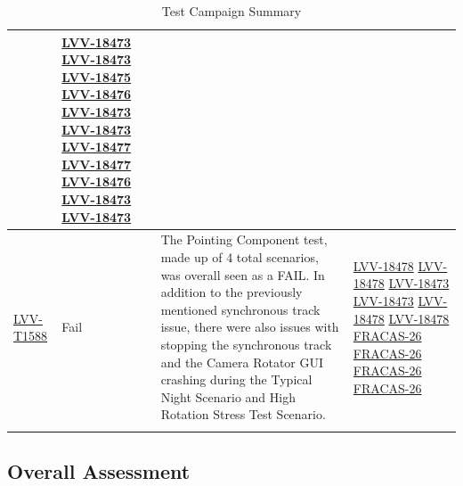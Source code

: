 \documentclass[SE,lsstdraft,STR,toc]{lsstdoc}
\begin{document}
\begin{longtable}{p{2cm}p{2.5cm}p{9cm}p{2.5cm}}
\begin{minipage}[]{9cm}
    \medskip
    \end{minipage}
    &
          \href{https://jira.lsstcorp.org/browse/LVV-18473}{LVV-18473}
          \href{https://jira.lsstcorp.org/browse/LVV-18473}{LVV-18473}
          \href{https://jira.lsstcorp.org/browse/LVV-18475}{LVV-18475}
          \href{https://jira.lsstcorp.org/browse/LVV-18476}{LVV-18476}
          \href{https://jira.lsstcorp.org/browse/LVV-18473}{LVV-18473}
          \href{https://jira.lsstcorp.org/browse/LVV-18473}{LVV-18473}
          \href{https://jira.lsstcorp.org/browse/LVV-18477}{LVV-18477}
          \href{https://jira.lsstcorp.org/browse/LVV-18477}{LVV-18477}
          \href{https://jira.lsstcorp.org/browse/LVV-18476}{LVV-18476}
          \href{https://jira.lsstcorp.org/browse/LVV-18473}{LVV-18473}
          \href{https://jira.lsstcorp.org/browse/LVV-18473}{LVV-18473}
    \\\hline
    \href{https://jira.lsstcorp.org/secure/Tests.jspa#/testCase/LVV-T1588}{LVV-T1588}
    & Fail &
    \begin{minipage}[]{9cm}
    \smallskip
     The Pointing Component test, made up of 4 total scenarios, was overall
seen as a FAIL. In addition to the previously mentioned synchronous
track issue, there were also issues with stopping the synchronous track
and the Camera Rotator GUI crashing during the Typical Night Scenario
and High Rotation Stress Test Scenario.

    \medskip
    \end{minipage}
    &
          \href{https://jira.lsstcorp.org/browse/LVV-18478}{LVV-18478}
          \href{https://jira.lsstcorp.org/browse/LVV-18478}{LVV-18478}
          \href{https://jira.lsstcorp.org/browse/LVV-18473}{LVV-18473}
          \href{https://jira.lsstcorp.org/browse/LVV-18473}{LVV-18473}
          \href{https://jira.lsstcorp.org/browse/LVV-18478}{LVV-18478}
          \href{https://jira.lsstcorp.org/browse/LVV-18478}{LVV-18478}
          \href{https://jira.lsstcorp.org/browse/FRACAS-26}{FRACAS-26}
          \href{https://jira.lsstcorp.org/browse/FRACAS-26}{FRACAS-26}
          \href{https://jira.lsstcorp.org/browse/FRACAS-26}{FRACAS-26}
          \href{https://jira.lsstcorp.org/browse/FRACAS-26}{FRACAS-26}
    \\\hline
\caption{Test Campaign Summary}
\label{table:summary}
\end{longtable}

\subsection{Overall Assessment}
\label{sect:overallassessment}
\end{document}
